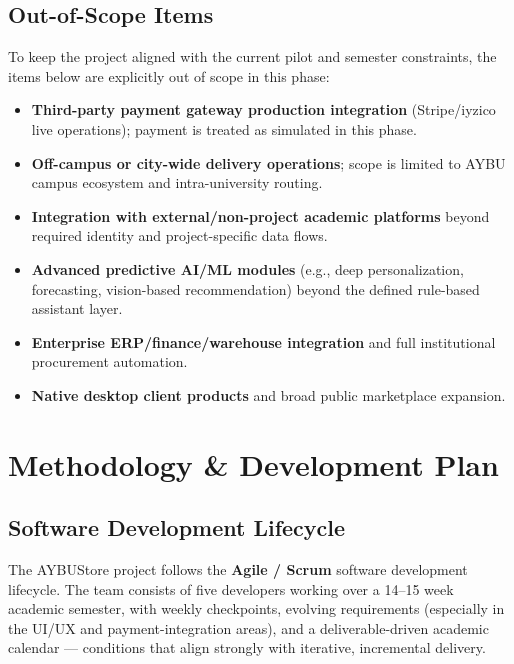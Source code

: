 \documentclass[11pt,a4paper]{article}
\begin{document}
\subsection{Out-of-Scope Items}
To keep the project aligned with the current pilot and semester
constraints, the items below are explicitly out of scope in this phase:
\begin{itemize}[leftmargin=*]
    \item \textbf{Third-party payment gateway production integration}
    (Stripe/iyzico live operations); payment is treated as simulated in
    this phase.
    \item \textbf{Off-campus or city-wide delivery operations}; scope is
    limited to AYBU campus ecosystem and intra-university routing.
    \item \textbf{Integration with external/non-project academic
    platforms} beyond required identity and project-specific data flows.
    \item \textbf{Advanced predictive AI/ML modules} (e.g., deep
    personalization, forecasting, vision-based recommendation) beyond
    the defined rule-based assistant layer.
    \item \textbf{Enterprise ERP/finance/warehouse integration} and
    full institutional procurement automation.
    \item \textbf{Native desktop client products} and broad public
    marketplace expansion.
\end{itemize}
 
\section{Methodology \& Development Plan}
\label{sec:methodology}
 
\subsection{Software Development Lifecycle}
The AYBUStore project follows the \textbf{Agile / Scrum} software
development lifecycle. The team consists of five developers working
over a 14--15 week academic semester, with weekly checkpoints,
evolving requirements (especially in the UI/UX and payment-integration
areas), and a deliverable-driven academic calendar --- conditions that
align strongly with iterative, incremental delivery.
 
\end{document}
